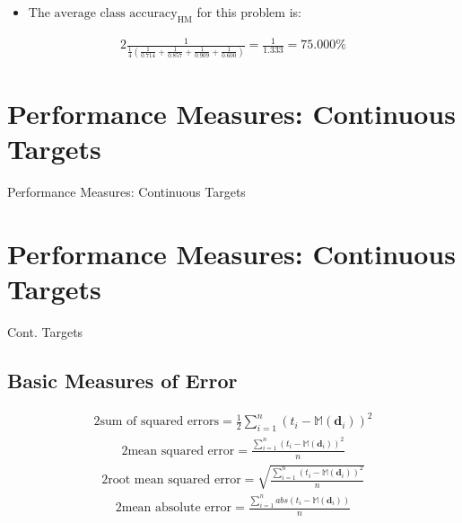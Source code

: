 \documentclass[xcolor={table}]{beamer}
\newcommand{\SectionSlideShortHeader}[3][]{
	\ifthenelse{\isempty{#1}}
		{\section[#3]{#2}\begin{frame} \begin{center}\begin{huge}#2\end{huge}\end{center}\end{frame}}
		{\section[#1]{#2}\begin{frame} \begin{center}\begin{huge}#3\end{huge}\end{center}\end{frame}}
}
\begin{document}
\begin{frame} 
\begin{itemize}
	\item The $\text{average class accuracy}_\text{HM}$ for this problem is:
\end{itemize}
\begin{alignat*}{2}
\displaystyle \frac{1}{\displaystyle  \frac{1}{4}\left(\frac{1}{0.714} + \frac{1}{0.857} + \frac{1}{0.909} + \frac{1}{0.600}\right)} = \frac{1}{1.333} = 75.000\%
\end{alignat*}
\end{frame} 


\SectionSlideShortHeader{Performance Measures: Continuous Targets}{Cont. Targets}

\subsection{Basic Measures of Error}

 \begin{frame} 
\begin{alignat}{2}
\text{sum of squared errors} = \frac{1}{2} \sum_{i=1}^{n} (t_i - \mathbb{M}(\mathbf{d}_i))^2 
\label{eq:sumOfSquaredErrors}
\end{alignat}
\begin{alignat}{2}
\text{mean squared error} =  \frac{\displaystyle\sum_{i=1}^{n} (t_i - \mathbb{M}(\mathbf{d}_i))^2}{n}
\label{eq:meanSquaredError}
\end{alignat}
\begin{alignat}{2}
\text{root mean squared error} =  \displaystyle \sqrt{\displaystyle \frac{ \displaystyle \sum_{i=1}^{n} (t_i - \mathbb{M}(\mathbf{d}_i))^2}{n}}
\label{eq:rootMeanSquaredError}
\end{alignat}
\begin{alignat}{2}
\text{mean absolute error} =  \displaystyle \frac{ \displaystyle \sum_{i=1}^{n} abs(t_i - \mathbb{M}(\mathbf{d}_i))}{n}
\label{eq:meanAbsolouteError}
\end{alignat}
\end{frame} 
\end{document}
